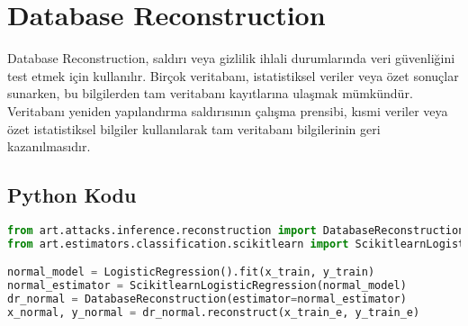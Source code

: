 \section{Database Reconstruction}

Database Reconstruction, saldırı veya gizlilik ihlali durumlarında veri güvenliğini test etmek için kullanılır. Birçok veritabanı, istatistiksel veriler veya özet sonuçlar sunarken, bu bilgilerden tam veritabanı kayıtlarına ulaşmak mümkündür. Veritabanı yeniden yapılandırma saldırısının çalışma prensibi, kısmi veriler veya özet istatistiksel bilgiler kullanılarak tam veritabanı bilgilerinin geri kazanılmasıdır. 

\subsection{Python Kodu}

\begin{lstlisting}[language=Python]
from art.attacks.inference.reconstruction import DatabaseReconstruction
from art.estimators.classification.scikitlearn import ScikitlearnLogisticRegression

normal_model = LogisticRegression().fit(x_train, y_train)
normal_estimator = ScikitlearnLogisticRegression(normal_model)
dr_normal = DatabaseReconstruction(estimator=normal_estimator)
x_normal, y_normal = dr_normal.reconstruct(x_train_e, y_train_e)
\end{lstlisting}

\newpage